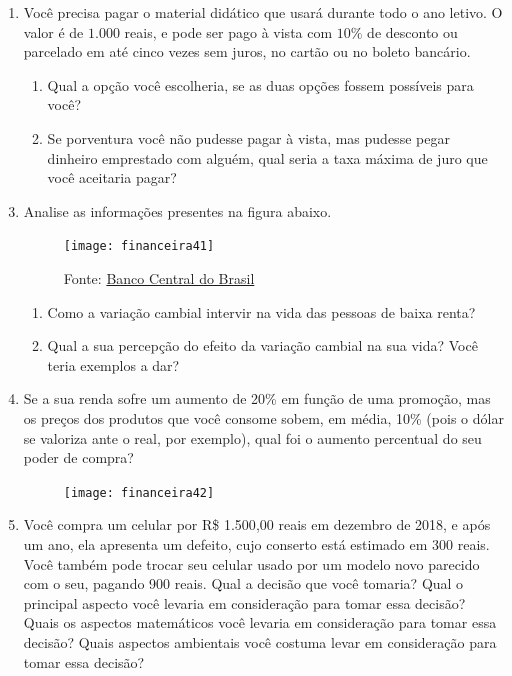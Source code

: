 \begin{enumerate}
\item Você precisa pagar o material didático que usará durante todo o ano letivo. O valor é de $1.000$ reais, e pode ser pago à vista com $10\%$ de desconto ou parcelado em até cinco vezes sem juros, no cartão ou no boleto bancário. 
  \begin{enumerate}
  \item Qual a opção você escolheria, se as duas opções fossem possíveis para você?
  \item Se porventura você não pudesse pagar à vista, mas pudesse pegar dinheiro emprestado com alguém, qual seria a taxa máxima de juro que você aceitaria pagar?
  \end{enumerate}
\end{enumerate}
\clearpage

\begin{enumerate}
\setcounter{enumi}{2}
\item Analise as informações presentes na figura abaixo.
\begin{figure}[H]
\centering

\texttt{[image: financeira41]}
\caption{Fonte: \href{https://www.bcb.gov.br/}{Banco Central do Brasil}}
\end{figure}
  \begin{enumerate}
    \item Como a variação cambial intervir na vida das pessoas de baixa renta?
    \item Qual a sua percepção do efeito da variação cambial na sua vida? Você teria exemplos a dar?
  \end{enumerate}

\item Se a sua renda sofre um aumento de 20\% em função de uma promoção, mas os preços dos produtos que você consome sobem, em média, 10\% (pois o dólar se valoriza ante o real, por exemplo), qual foi o aumento percentual do seu poder de compra?

\begin{figure}[H]
\centering

\texttt{[image: financeira42]}
\end{figure}

\item Você compra um celular por R\$ 1.500{,}00 reais em dezembro de 2018, e após um ano, ela apresenta um defeito, cujo conserto está estimado em 300 reais. Você também pode trocar seu celular usado por um modelo novo parecido com o seu, pagando 900 reais. Qual a decisão que você tomaria? Qual o principal aspecto você levaria em consideração para tomar essa decisão? Quais os aspectos matemáticos você levaria em consideração para tomar essa decisão? Quais aspectos ambientais você costuma levar em consideração para tomar essa decisão?
\end{enumerate}

